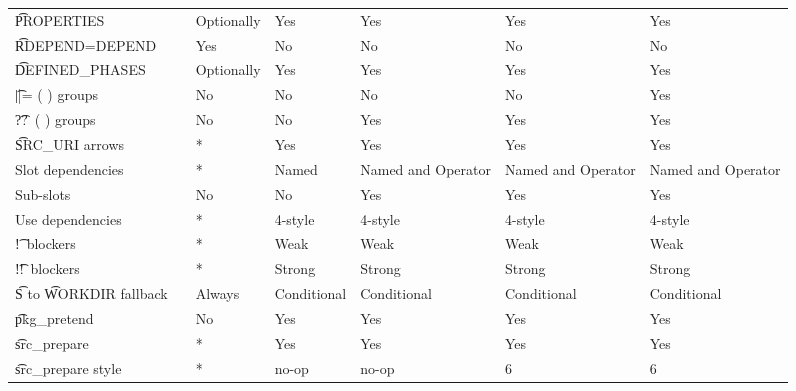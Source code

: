 \begin{landscape}
\begin{longtable}{llP{7.5em}P{7.5em}P{7.5em}P{7.5em}P{7.5em}}
\t{PROPERTIES} &  &
    Optionally & Yes & Yes & Yes & Yes \\

\t{RDEPEND=DEPEND} &  &
    Yes & No & No & No & No \\

\t{DEFINED_PHASES} &  &
    Optionally & Yes & Yes & Yes & Yes \\

\t{||= ( )} groups &  &
    No & No & No & No & Yes \\

\t{??\ ( )} groups &  &
    No & No & Yes & Yes & Yes \\

\t{SRC_URI} arrows &  &
    * & Yes & Yes & Yes & Yes \\

Slot dependencies &  &
    * & Named & Named and Operator & Named and Operator & Named and Operator \\

Sub-slots &  &
    No & No & Yes & Yes & Yes \\

Use dependencies &  &
    * & 4-style & 4-style & 4-style & 4-style \\

\t{!}\ blockers &  &
    * & Weak & Weak & Weak & Weak \\

\t{!!}\ blockers &  &
    * & Strong & Strong & Strong & Strong \\

\t{S} to \t{WORKDIR} fallback &  &
    Always & Conditional & Conditional & Conditional & Conditional \\

\t{pkg_pretend} &  &
    No & Yes & Yes & Yes & Yes \\

\t{src_prepare} &  &
    * & Yes & Yes & Yes & Yes \\

\t{src_prepare} style &  &
    * & no-op & no-op & 6 & 6 \\


\end{longtable}
\end{landscape}
